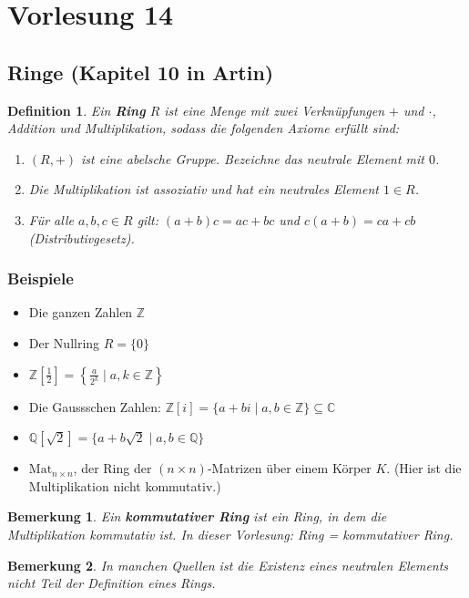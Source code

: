 \documentclass{article}
\theoremstyle{plain}
\newtheorem{definition}{Definition}
\newtheorem{bemerkung}{Bemerkung}
\newcommand{\defn}[1]{\textbf{#1}}
\newcommand{\C}{\mathbb{C}}
\newcommand{\Z}{\mathbb{Z}}
\newcommand{\Q}{\mathbb{Q}}
\newcommand{\mat}{\mathrm{Mat}}
\begin{document}
\section*{Vorlesung 14}
\subsection*{Ringe (Kapitel 10 in Artin)}

\begin{definition}
    Ein \defn{Ring} $R$ ist eine Menge mit zwei Verknüpfungen $+$ und $\cdot$, Addition und Multiplikation, sodass die folgenden Axiome erfüllt sind:
    \begin{enumerate}[label=(\alph*)]
        \item $(R, +)$ ist eine abelsche Gruppe. Bezeichne das neutrale Element mit $0$. 
        \item Die Multiplikation ist assoziativ und hat ein neutrales Element $1\in R$.
        \item Für alle $a, b, c\in R$ gilt: $(a+b)c = ac+bc$ und $c(a+b)=ca+cb$ (Distributivgesetz).
    \end{enumerate}
\end{definition}

\subsubsection*{Beispiele}
    \begin{itemize}
        \item Die ganzen Zahlen $\Z$
        \item Der Nullring $R=\{0\}$
        \item $\Z\left[\frac{1}{2}\right] = \left\{\frac{a}{2^k}\mid a, k \in \Z\right\}$
        \item Die Gaussschen Zahlen: $\Z[i]=\{a+bi\mid a, b\in \Z\}\subseteq \C$
        \item $\Q[\sqrt{2}]=\{a+b\sqrt{2}\mid a, b\in \Q\}$
        \item $\mat_{n\times n}$, der Ring der $(n\times n)$-Matrizen über einem Körper $K$. (Hier ist die Multiplikation nicht kommutativ.)
    \end{itemize}

\begin{bemerkung}
    Ein \defn{kommutativer Ring} ist ein Ring, in dem die Multiplikation kommutativ ist.  In dieser Vorlesung: Ring = kommutativer Ring.
\end{bemerkung}

\begin{bemerkung}
    In manchen Quellen ist die Existenz eines neutralen Elements nicht Teil der Definition eines Rings.
\end{bemerkung}
\end{document}
